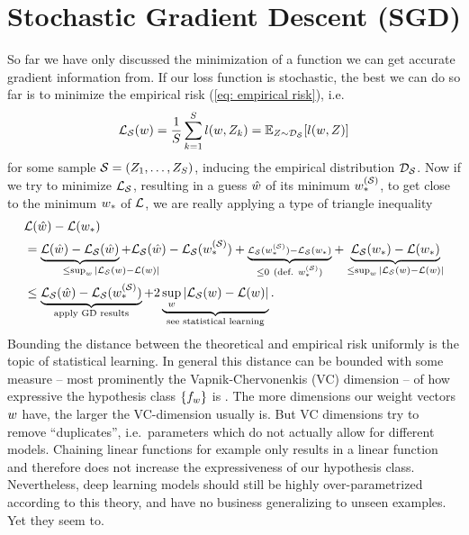 
\chapter{Stochastic Gradient Descent (SGD)}\label{chap: sgd}

So far we have only discussed the minimization of a function we can get accurate
gradient information from. If our loss function is stochastic, the best we can
do so far is to minimize the empirical risk (\ref{eq: empirical risk}), i.e.
\begin{align*}
	\mathcal{L}_{\mathcal{S}}(w) = \frac{1}{S}\sum_{k=1}^S l(w, Z_k)
	= \mathbb{E}_{Z\sim \mathcal{D}_{\mathcal{S}}}[l(w, Z)]
\end{align*}
for some sample \(\mathcal{S}=(Z_1,\dots,Z_S)\), inducing the empirical
distribution \(\mathcal{D}_{\mathcal{S}}\). Now if we try to minimize \(\mathcal{L}_{\mathcal{S}}\),
resulting in a guess \(\hat{w}\) of its minimum \(w_*^{(\mathcal{S})}\),
to get close to the minimum \(w_*\) of \(\mathcal{L}\), we are really applying a
type of triangle
inequality \parencite[e.g.][]{bottouOptimizationMethodsLargeScale2018}
\begin{align*}
	&\Loss(\hat{\weights}) - \Loss(\minimum)\\
	&=
	\underbrace{\Loss(\hat{\weights}) - \Loss_\sample(\hat{\weights})}_{
	\le \sup_{\weights}|\mathrlap{\Loss_\sample(\weights)-\Loss(\weights)|}
	}
	{
	+ \Loss_\sample(\hat{\weights}) - \Loss_\sample(\minimum^{(\sample)})
	+ \underbrace{
		\scriptstyle
		\Loss_\sample(\minimum^{(\sample)}) - \Loss_\sample(\minimum)
	}_{\le 0\ (\text{def. }\minimum^{(\sample)})}
	}
	+ \underbrace{
		\Loss_\sample(\minimum)- \Loss(\minimum)
	}_{\le \sup_{\weights}|\Loss_\sample(\weights)-\Loss(\weights)|}
	\\
	&\le \underbrace{\Loss_\sample(\hat{\weights}) - \Loss_\sample(\minimum^{(\sample)})}_{
		\text{apply GD results}
	}
	+ 2\underbrace{\sup_{\weights}|\Loss_\sample(\weights)-\Loss(\weights)|}_{\text{see statistical learning}}.
\end{align*}
Bounding the distance between the theoretical and empirical risk uniformly is
the topic of statistical learning. In general this distance can be bounded with
some measure -- most prominently the Vapnik-Chervonenkis (VC) dimension -- of how
expressive the hypothesis class \(\{f_{w}\}\) is
\parencite{vapnikOverviewStatisticalLearning1999}. The more dimensions our
weight vectors \(w\) have, the larger the VC-dimension usually is. But
VC dimensions try to remove ``duplicates'', i.e.\ parameters which do not
actually allow for different models. Chaining linear functions for example only
results in a linear function and therefore does not increase the expressiveness
of our hypothesis class. Nevertheless, deep learning models should still be
highly over-parametrized according to this theory, and have no business
generalizing to unseen examples. Yet they seem to.

